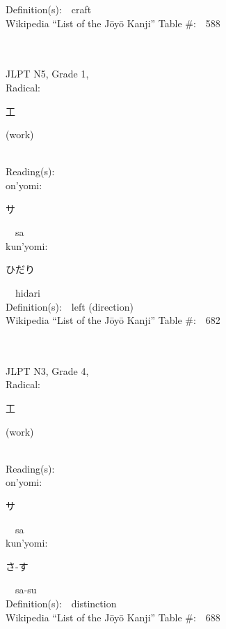 \begin{multicols}{2}
Definition(s):\ \ craft \\
Wikipedia ``List of the J\=oy\=o Kanji'' Table \#:\ \ 588 \\
\ \ \\
{\fontsize{34pt}{40pt}  }\ \ \\  %
{JLPT N5, Grade 1, \\Radical:\ \ {\begin{CJK}{UTF8}{min} 工 \end{CJK}} (work) } \\
Reading(s):\ \ \\
{\hspace*{1em}}on'yomi:\ \ \\
{\hspace*{2em}}{\begin{CJK}{UTF8}{min} サ \end{CJK}}\ \ sa\ \ \\
{\hspace*{1em}}kun'yomi:\ \ \\
{\hspace*{2em}}{\begin{CJK}{UTF8}{min} ひだり \end{CJK}}\ \ hidari\ \ \\
Definition(s):\ \ left (direction) \\
Wikipedia ``List of the J\=oy\=o Kanji'' Table \#:\ \ 682 \\
\ \ \\
{\fontsize{34pt}{40pt}  }\ \ \\  %
{JLPT N3, Grade 4, \\Radical:\ \ {\begin{CJK}{UTF8}{min} 工 \end{CJK}} (work) } \\
Reading(s):\ \ \\
{\hspace*{1em}}on'yomi:\ \ \\
{\hspace*{2em}}{\begin{CJK}{UTF8}{min} サ \end{CJK}}\ \ sa\ \ \\
{\hspace*{1em}}kun'yomi:\ \ \\
{\hspace*{2em}}{\begin{CJK}{UTF8}{min} さ-す \end{CJK}}\ \ sa-su\ \ \\
Definition(s):\ \ distinction \\
Wikipedia ``List of the J\=oy\=o Kanji'' Table \#:\ \ 688 \\
\ \ \\
\end{multicols}


